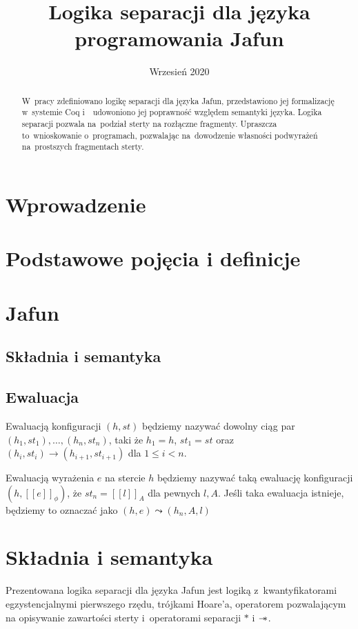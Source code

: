 \documentclass[]{pracamgr}
\title{Logika separacji dla języka programowania Jafun}
\date{Wrzesień 2020}
\newcommand \wand {\mathrel{-\mkern-6mu*}}
\renewcommand \| {\hspace{0.75em} | \hspace{0.75em} }
\renewcommand \[ {[\![}
\renewcommand \] {]\!]}
\begin{document}
\maketitle

\begin{abstract}
  W~pracy zdefiniowano logikę separacji dla języka Jafun, przedstawiono jej formalizację
  w~systemie Coq i~~udowoniono jej poprawność względem semantyki języka. Logika separacji pozwala
  na~podział sterty na rozłączne fragmenty. Upraszcza to~wnioskowanie o~programach, pozwalając
  na~dowodzenie własności podwyrażeń na~prostszych fragmentach sterty.
\end{abstract}

\tableofcontents

\chapter*{Wprowadzenie}

\chapter{Podstawowe pojęcia i definicje}

\chapter{Jafun}

\section{Składnia i semantyka}

\section{Ewaluacja}
Ewaluacją konfiguracji $(h, st)$ będziemy nazywać dowolny ciąg par $(h_1, st_1), \ldots, (h_n, st_n)$, taki że
$h_1 = h$, $st_1 = st$ oraz $(h_i, st_i) \rightarrow (h_{i+1}, st_{i+1})$ dla $1 \leq i < n$.

Ewaluacją wyrażenia $e$ na stercie $h$ będziemy nazywać taką ewaluację konfiguracji $(h, \[ e \]_\phi)$,
że $st_n = \[ l \]_A$ dla pewnych $l, A$. Jeśli taka ewaluacja istnieje, będziemy to oznaczać jako
$(h, e) \leadsto (h_n, A, l)$

\chapter{Składnia i semantyka}
Prezentowana logika separacji dla języka Jafun jest logiką z~kwantyfikatorami egzystencjalnymi pierwszego rzędu, trójkami Hoare'a, operatorem
pozwalającym na opisywanie zawartości sterty i~operatorami separacji $*$ i $\wand$.
\end{document}
